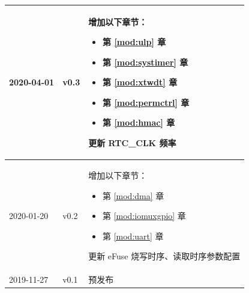 \begin{longtable}[l]{ | m{2cm} | m{1.5cm} | m{12cm} | }
    2020-04-01&v0.3&
    增加以下章节：
    \begin{itemize}
    \item 第 \ref{mod:ulp} 章 \textit{\nameref{mod:ulp}}
    \item 第 \ref{mod:systimer} 章 \textit{\nameref{mod:systimer}}
    \item 第 \ref{mod:xtwdt} 章 \textit{\nameref{mod:xtwdt}}
    \item 第 \ref{mod:permctrl} 章 \textit{\nameref{mod:permctrl}}
    \item 第 \ref{mod:hmac} 章
    \textit{\nameref{mod:hmac}}
    \end{itemize}
    更新 RTC\_CLK 频率
    \\\hline

    2020-01-20&v0.2&
    增加以下章节：
    \begin{itemize}
    \item 第 \ref{mod:dma} 章 \textit{\nameref{mod:dma}}
    \item 第 \ref{mod:iomuxgpio} 章 \textit{\nameref{mod:iomuxgpio}}
    \item 第 \ref{mod:uart} 章 \textit{\nameref{mod:uart}}
    \end{itemize}

    更新 eFuse 烧写时序、读取时序参数配置
    \\\hline
    2019-11-27 & v0.1 & 预发布
    \\\hline
\end{longtable}
